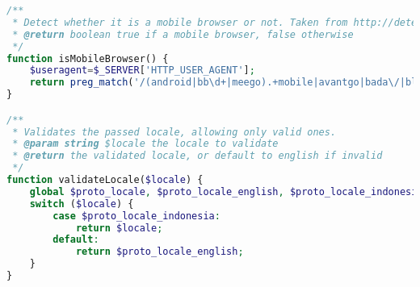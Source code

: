\begin{lstlisting}[language=PHP,basicstyle=\tiny,caption=utils.php,label={lst:utils.php}]
/**
 * Detect whether it is a mobile browser or not. Taken from http://detectmobilebrowsers.com/
 * @return boolean true if a mobile browser, false otherwise
 */
function isMobileBrowser() {
	$useragent=$_SERVER['HTTP_USER_AGENT'];
	return preg_match('/(android|bb\d+|meego).+mobile|avantgo|bada\/|blackberry|blazer|compal|elaine|fennec|hiptop|iemobile|ip(hone|od)|iris|kindle|lge |maemo|midp|mmp|mobile.+firefox|netfront|opera m(ob|in)i|palm( os)?|phone|p(ixi|re)\/|plucker|pocket|psp|series(4|6)0|symbian|treo|up\.(browser|link)|vodafone|wap|windows (ce|phone)|xda|xiino/i',$useragent)||preg_match('/1207|6310|6590|3gso|4thp|50[1-6]i|770s|802s|a wa|abac|ac(er|oo|s\-)|ai(ko|rn)|al(av|ca|co)|amoi|an(ex|ny|yw)|aptu|ar(ch|go)|as(te|us)|attw|au(di|\-m|r |s )|avan|be(ck|ll|nq)|bi(lb|rd)|bl(ac|az)|br(e|v)w|bumb|bw\-(n|u)|c55\/|capi|ccwa|cdm\-|cell|chtm|cldc|cmd\-|co(mp|nd)|craw|da(it|ll|ng)|dbte|dc\-s|devi|dica|dmob|do(c|p)o|ds(12|\-d)|el(49|ai)|em(l2|ul)|er(ic|k0)|esl8|ez([4-7]0|os|wa|ze)|fetc|fly(\-|_)|g1 u|g560|gene|gf\-5|g\-mo|go(\.w|od)|gr(ad|un)|haie|hcit|hd\-(m|p|t)|hei\-|hi(pt|ta)|hp( i|ip)|hs\-c|ht(c(\-| |_|a|g|p|s|t)|tp)|hu(aw|tc)|i\-(20|go|ma)|i230|iac( |\-|\/)|ibro|idea|ig01|ikom|im1k|inno|ipaq|iris|ja(t|v)a|jbro|jemu|jigs|kddi|keji|kgt( |\/)|klon|kpt |kwc\-|kyo(c|k)|le(no|xi)|lg( g|\/(k|l|u)|50|54|\-[a-w])|libw|lynx|m1\-w|m3ga|m50\/|ma(te|ui|xo)|mc(01|21|ca)|m\-cr|me(rc|ri)|mi(o8|oa|ts)|mmef|mo(01|02|bi|de|do|t(\-| |o|v)|zz)|mt(50|p1|v )|mwbp|mywa|n10[0-2]|n20[2-3]|n30(0|2)|n50(0|2|5)|n7(0(0|1)|10)|ne((c|m)\-|on|tf|wf|wg|wt)|nok(6|i)|nzph|o2im|op(ti|wv)|oran|owg1|p800|pan(a|d|t)|pdxg|pg(13|\-([1-8]|c))|phil|pire|pl(ay|uc)|pn\-2|po(ck|rt|se)|prox|psio|pt\-g|qa\-a|qc(07|12|21|32|60|\-[2-7]|i\-)|qtek|r380|r600|raks|rim9|ro(ve|zo)|s55\/|sa(ge|ma|mm|ms|ny|va)|sc(01|h\-|oo|p\-)|sdk\/|se(c(\-|0|1)|47|mc|nd|ri)|sgh\-|shar|sie(\-|m)|sk\-0|sl(45|id)|sm(al|ar|b3|it|t5)|so(ft|ny)|sp(01|h\-|v\-|v )|sy(01|mb)|t2(18|50)|t6(00|10|18)|ta(gt|lk)|tcl\-|tdg\-|tel(i|m)|tim\-|t\-mo|to(pl|sh)|ts(70|m\-|m3|m5)|tx\-9|up(\.b|g1|si)|utst|v400|v750|veri|vi(rg|te)|vk(40|5[0-3]|\-v)|vm40|voda|vulc|vx(52|53|60|61|70|80|81|83|85|98)|w3c(\-| )|webc|whit|wi(g |nc|nw)|wmlb|wonu|x700|yas\-|your|zeto|zte\-/i',substr($useragent,0,4));
}

/**
 * Validates the passed locale, allowing only valid ones.
 * @param string $locale the locale to validate
 * @return the validated locale, or default to english if invalid
 */
function validateLocale($locale) {
	global $proto_locale, $proto_locale_english, $proto_locale_indonesia;
	switch ($locale) {
		case $proto_locale_indonesia:
			return $locale;
		default:
			return $proto_locale_english;
	}
}


\end{lstlisting}
